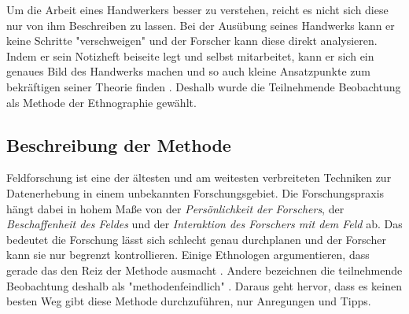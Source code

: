 Um die Arbeit eines Handwerkers besser zu verstehen, reicht es nicht sich diese nur von ihm Beschreiben zu lassen. Bei der Ausübung seines Handwerks kann er keine Schritte "verschweigen" und der Forscher kann diese direkt analysieren. Indem er sein Notizheft beiseite legt und selbst mitarbeitet, kann er sich ein genaues Bild des Handwerks machen und so auch kleine Ansatzpunkte zum bekräftigen seiner Theorie finden \cite{malinowski_argonauts_1922}. Deshalb wurde die Teilnehmende Beobachtung als Methode der Ethnographie gewählt.

\subsection{Beschreibung der Methode}

Feldforschung ist eine der ältesten und am weitesten verbreiteten Techniken zur Datenerhebung in einem unbekannten Forschungsgebiet. Die Forschungspraxis hängt dabei in hohem Maße von der \textit{Persönlichkeit der Forschers}, der \textit{Beschaffenheit des Feldes} und der \textit{Interaktion des Forschers mit dem Feld} ab. Das bedeutet die Forschung lässt sich schlecht genau durchplanen und der Forscher kann sie nur begrenzt kontrollieren. Einige Ethnologen argumentieren, dass gerade das den Reiz der Methode ausmacht \cite{rottenburg_feldforschung_nodate}. Andere bezeichnen die teilnehmende Beobachtung deshalb als "methodenfeindlich" \cite{kuhl_handbuch_2009}. Daraus geht hervor, dass es keinen besten Weg gibt diese Methode durchzuführen, nur Anregungen und Tipps.

